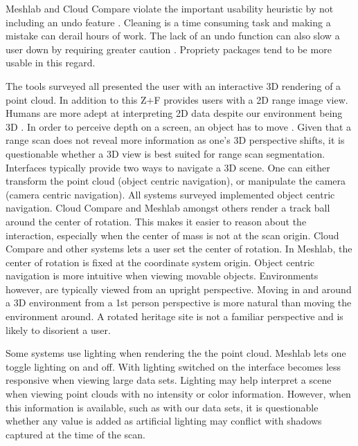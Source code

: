 Meshlab and Cloud Compare violate the important usability heuristic by not including an undo feature \cite{Nielsen2005}. Cleaning is a time consuming task and making a mistake can derail hours of work. The lack of an undo function can also slow a user down by requiring greater caution \cite{Miller1977}. Propriety packages tend to be more usable in this regard.


The tools surveyed all presented the user with an interactive 3D rendering of a point cloud. In addition to this Z+F \cite{Z+F2014} provides users with a 2D range image view. Humans are more adept at interpreting 2D data despite our environment being 3D \cite{Livingstone1987}. In order to perceive depth on a screen, an object has to move . Given that a range scan does not reveal more information as one's 3D perspective shifts, it is questionable whether a 3D view is best suited for range scan segmentation. \\

Interfaces typically provide two ways to navigate a 3D scene. One can either transform the point cloud (object centric navigation), or manipulate the camera (camera centric navigation). All systems surveyed implemented object centric navigation. Cloud Compare and Meshlab amongst others render a track ball around the center of rotation. This makes it easier to reason about the interaction, especially when the center of mass is not at the scan origin. Cloud Compare and other systems lets a user set the center of rotation. In Meshlab, the center of rotation is fixed at the coordinate system origin. Object centric navigation is more intuitive when viewing movable objects. Environments however, are typically viewed from an upright perspective. Moving in and around a 3D environment from a 1st person perspective is more natural than moving the environment around. A rotated heritage site is not a familiar perspective and is likely to disorient a user.

Some systems use lighting when rendering the the point cloud. Meshlab lets one toggle lighting on and off. With lighting switched on the interface becomes less responsive when viewing large data sets. Lighting may help interpret a scene when viewing point clouds with no intensity or color information. However, when this information is available, such as with our data sets, it is questionable whether any value is added as artificial lighting may conflict with shadows captured at the time of the scan.


